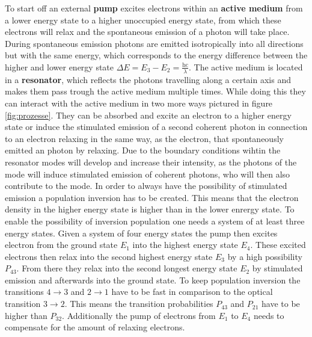         To start off an external \textbf{pump} excites electrons within an \textbf{active medium} from a lower energy state to a higher unoccupied energy state, from which these electrons will relax and the
        spontaneous emission of a photon will take place. During spontaneous emission photons are emitted isotropically into all directions but with the same energy, which corresponds to the energy difference
        between the higher and lower energy state $\Delta E = E_3 - E_2 = \frac{\text{hc}}{\lambda}$. The active medium is located in a \textbf{resonator}, which reflects the photons travelling along a certain axis and makes them pass trough the active medium
        multiple times. While doing this they can interact with the active medium in two more ways pictured in figure \ref{fig:prozesse}. They can be absorbed and excite an electron to a higher energy state or
        induce the stimulated emission of a second coherent photon in connection to an electron relaxing in the same way, as the electron, that spontaneously emitted an photon by relaxing. Due to the boundary conditions wihtin 
        the resonator modes will develop and increase their intensity, as the photons of the mode will induce stimulated emission of coherent photons, who will then also contribute to the mode. In order to always 
        have the possibility of stimulated emission a population inversion has to be created. This means that the electron density in the higher energy state is higher than in the lower enrergy state. To enable
        the possibility of inversion population one needs a system of at least three energy states. Given a system of four energy states the pump then excites electron from the ground state $E_{\text{1}}$ into 
        the highest energy state $E_{\text{4}}$. These excited electrons then relax into the second highest energy state $E_{\text{3}}$ by a high possibility $P_{\text{43}}$. From there they relax into the 
        second longest energy state $E_{\text{2}}$ by stimulated emission and afterwards into the ground state. To keep population inversion the transitions $4\rightarrow3$ and $2\rightarrow1$ have to be fast in
        comparison to the optical transition $3\rightarrow2$. This means the transition probabilities $P_{\text{43}}$ and $P_{\text{21}}$ have to be higher than $P_{\text{32}}$. Additionally the pump of 
        electrons from $E_{\text{1}}$ to $E_{\text{4}}$ needs to compensate for the amount of relaxing electrons.

